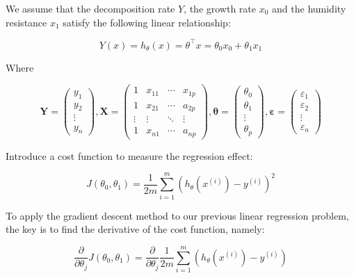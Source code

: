 \documentclass{mcmthesis}
\begin{document}
We assume that the decomposition rate $ Y $, the growth rate $ x_0 $ and the humidity resistance $ x_1 $ satisfy the following linear relationship: 

\begin{equation}
  Y(x)=h_\theta(x)=\theta^{\top} x=\theta_{0} x_{0}+\theta_{1} x_{1}
\end{equation}

Where

\begin{equation}
  \boldsymbol{Y}=\left(\begin{array}{c}
  y_{1} \\
  y_{2} \\
  \vdots \\
  y_{n}
  \end{array}\right), \boldsymbol{X}=\left(\begin{array}{cccc}
  1 & x_{11} & \cdots & x_{1 p} \\
  1 & x_{21} & \cdots & a_{2 p} \\
  \vdots & \vdots & \ddots & \vdots \\
  1 & x_{n 1} & \cdots & a_{n p}
  \end{array}\right), \boldsymbol{\theta}=\left(\begin{array}{c}
  \theta_{0} \\
  \theta_{1} \\
  \vdots \\
  \theta_{p}
  \end{array}\right), \boldsymbol{\varepsilon}=\left(\begin{array}{c}
  \varepsilon_{1} \\
  \varepsilon_{2} \\
  \vdots \\
  \varepsilon_{n}
  \end{array}\right)
\end{equation}

Introduce a cost function to measure the regression effect:

\begin{equation}
  J\left(\theta_{0}, \theta_{1}\right)=\frac{1}{2 m} \sum_{i=1}^{m}\left(h_{\theta}\left(x^{(i)}\right)-y^{(i)}\right)^{2}
\end{equation}

To apply the gradient descent method to our previous linear regression problem, the key is to find the derivative of the cost function, namely: 

\begin{equation}
  \frac{\partial}{\partial \theta_{j}} J\left(\theta_{0}, \theta_{1}\right)=\frac{\partial}{\partial \theta_{j}} \frac{1}{2 m} \sum_{i=1}^{m}\left(h_{\theta}\left(x^{(i)}\right)-y^{(i)}\right)
\end{equation}
\end{document}
